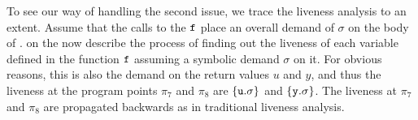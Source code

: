 \documentclass[10pt]{sigplanconf}
\begin{document}


To see  our way of  handling the second  issue, we trace  the liveness
analysis to  an extent. Assume  that the calls  to the $\mbox{\tt f}$  place an
overall demand  of $\sigma$ on the  body of \pf.  on  the now describe
the process  of finding out the  liveness of each  variable defined in
the function  $\mbox{\tt f}$ assuming  a symbolic demand  $\sigma$ on  it.  For
obvious reasons, this is also the  demand on the return values $u$ and
$y$, and thus  the liveness at the program  points $\pi_7$ and $\pi_8$
are $\lbrace  \mbox{\tt u}.\sigma \rbrace$ and  $\{\mbox{\tt y}.\sigma\}$.  The liveness
at  $\pi_7$ and  $\pi_8$ are  propagated backwards  as  in traditional
liveness analysis.
\end{document}
